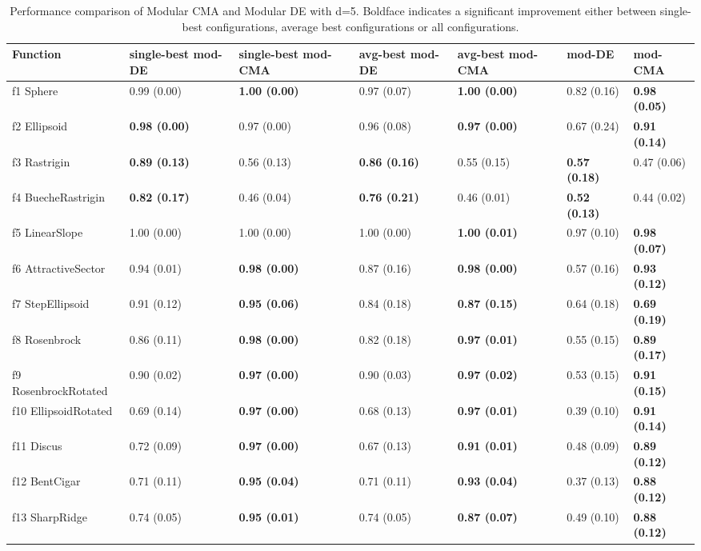 \begin{table}
\caption{Performance comparison of Modular CMA and Modular DE with d=5. Boldface indicates a significant improvement either between single-best configurations, average best configurations or all configurations.}
\begin{tabular}{lllllll}
\toprule
Function & single-best mod-DE & single-best mod-CMA & avg-best mod-DE & avg-best mod-CMA & mod-DE & mod-CMA \\
\midrule
f1 Sphere & 0.99 (0.00) & \textbf{1.00 (0.00)} & 0.97 (0.07) & \textbf{1.00 (0.00)} & 0.82 (0.16) & \textbf{0.98 (0.05)} \\
f2 Ellipsoid & \textbf{0.98 (0.00)} & 0.97 (0.00) & 0.96 (0.08) & \textbf{0.97 (0.00)} & 0.67 (0.24) & \textbf{0.91 (0.14)} \\
f3 Rastrigin & \textbf{0.89 (0.13)} & 0.56 (0.13) & \textbf{0.86 (0.16)} & 0.55 (0.15) & \textbf{0.57 (0.18)} & 0.47 (0.06) \\
f4 BuecheRastrigin & \textbf{0.82 (0.17)} & 0.46 (0.04) & \textbf{0.76 (0.21)} & 0.46 (0.01) & \textbf{0.52 (0.13)} & 0.44 (0.02) \\
f5 LinearSlope & 1.00 (0.00) & 1.00 (0.00) & 1.00 (0.00) & \textbf{1.00 (0.01)} & 0.97 (0.10) & \textbf{0.98 (0.07)} \\
f6 AttractiveSector & 0.94 (0.01) & \textbf{0.98 (0.00)} & 0.87 (0.16) & \textbf{0.98 (0.00)} & 0.57 (0.16) & \textbf{0.93 (0.12)} \\
f7 StepEllipsoid & 0.91 (0.12) & \textbf{0.95 (0.06)} & 0.84 (0.18) & \textbf{0.87 (0.15)} & 0.64 (0.18) & \textbf{0.69 (0.19)} \\
f8 Rosenbrock & 0.86 (0.11) & \textbf{0.98 (0.00)} & 0.82 (0.18) & \textbf{0.97 (0.01)} & 0.55 (0.15) & \textbf{0.89 (0.17)} \\
f9 RosenbrockRotated & 0.90 (0.02) & \textbf{0.97 (0.00)} & 0.90 (0.03) & \textbf{0.97 (0.02)} & 0.53 (0.15) & \textbf{0.91 (0.15)} \\
f10 EllipsoidRotated & 0.69 (0.14) & \textbf{0.97 (0.00)} & 0.68 (0.13) & \textbf{0.97 (0.01)} & 0.39 (0.10) & \textbf{0.91 (0.14)} \\
f11 Discus & 0.72 (0.09) & \textbf{0.97 (0.00)} & 0.67 (0.13) & \textbf{0.91 (0.01)} & 0.48 (0.09) & \textbf{0.89 (0.12)} \\
f12 BentCigar & 0.71 (0.11) & \textbf{0.95 (0.04)} & 0.71 (0.11) & \textbf{0.93 (0.04)} & 0.37 (0.13) & \textbf{0.88 (0.12)} \\
f13 SharpRidge & 0.74 (0.05) & \textbf{0.95 (0.01)} & 0.74 (0.05) & \textbf{0.87 (0.07)} & 0.49 (0.10) & \textbf{0.88 (0.12)} \\

\end{tabular}
\end{table}
